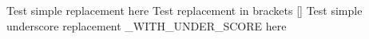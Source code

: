 \documentclass{article}
\author{pydefs Test}
\begin{document}
	Test simple replacement \SIMPLEDEF here
	Test replacement in brackets \test{\SIMPLEDEF} [\SIMPLEDEF]
	Test simple underscore replacement \DEF_WITH_UNDER_SCORE here
\end{document}
